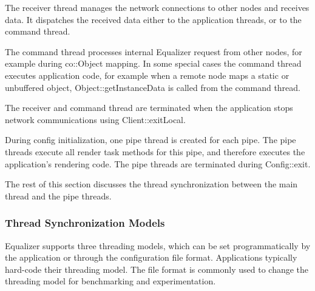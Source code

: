 \documentclass[10pt,a4]{scrartcl}
\begin{document}
The receiver thread manages the network connections to other nodes and
receives data. It dispatches the received data either to the application
threads, or to the command thread.

The command thread processes internal Equalizer request from other
nodes, for example during \textsf{co::Object} mapping. In some
special cases the command thread executes application code, for example
when a remote node maps a static or unbuffered object,
\textsf{Object::getInstanceData} is called from the command thread.

The receiver and command thread are terminated when the application
stops network communications using \textsf{Client::exitLocal}.

During config initialization, one pipe thread is created for each
pipe. The pipe threads execute all render task methods for this pipe,
and therefore executes the application's rendering code. The pipe
threads are terminated during \textsf{Config::exit}.

The rest of this section discusses the thread synchronization between
the main thread and the pipe threads.


\subsubsection{\label{sThreadModel}Thread Synchronization Models}
Equalizer supports three threading models, which can be set
programmatically by the application or through the configuration file
format. Applications typically hard-code their threading model. The file
format is commonly used to change the threading model for benchmarking
and experimentation.
\end{document}
